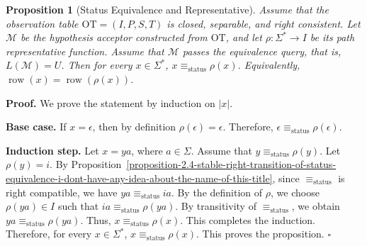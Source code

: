 \documentclass{ieice-tecrep}
\newtheorem{proposition}{Proposition}
\begin{document}
\begin{proposition}[Status Equivalence and Representative]\label{proposition-2.5-status-equivalence-and Representative}
Assume that the observation table
\(\mathrm{OT}=(I,P,S,T)\) is closed, separable, and right consistent.
Let \(\mathcal{M}\) be the hypothesis acceptor constructed from \(\mathrm{OT}\),
and let \(\rho:\Sigma^*\to I\) be its path representative function.
Assume that \(\mathcal{M}\) passes the equivalence query, that is, \(L(\mathcal{M})=U\). Then for every \(x\in\Sigma^*\), \(x\equiv_{\mathrm{status}}\rho(x)\). Equivalently, \(\operatorname{row}(x)=\operatorname{row}(\rho(x))\).
\end{proposition}
\noindent\textbf{Proof.} We prove the statement by induction on \(|x|\).

\noindent\textbf{Base case.} If \(x=\epsilon\), then by definition \(\rho(\epsilon)=\epsilon\). Therefore, \(\epsilon\equiv_{\mathrm{status}}\rho(\epsilon)\).

\noindent\textbf{Induction step.} Let \(x=ya\), where \(a\in\Sigma\). Assume that \(y\equiv_{\mathrm{status}}\rho(y)\). Let \(\rho(y)=i\). By Proposition~\ref{proposition-2.4-stable-right-transition-of-status-equivalence-i-dont-have-any-idea-about-the-name-of-this-title}, since \(\equiv_{\mathrm{status}}\) is right
compatible, we have \(ya\equiv_{\mathrm{status}}ia\). By the definition of \(\rho\), we choose \(\rho(ya)\in I\) such that \(ia\equiv_{\mathrm{status}}\rho(ya)\). By transitivity of \(\equiv_{\mathrm{status}}\), we obtain \(ya\equiv_{\mathrm{status}}\rho(ya)\). Thus, \(x\equiv_{\mathrm{status}}\rho(x)\). This completes the induction. Therefore, for every \(x\in\Sigma^*\), \(x\equiv_{\mathrm{status}}\rho(x)\). This proves the proposition.
\hfill $\square$
\end{document}
